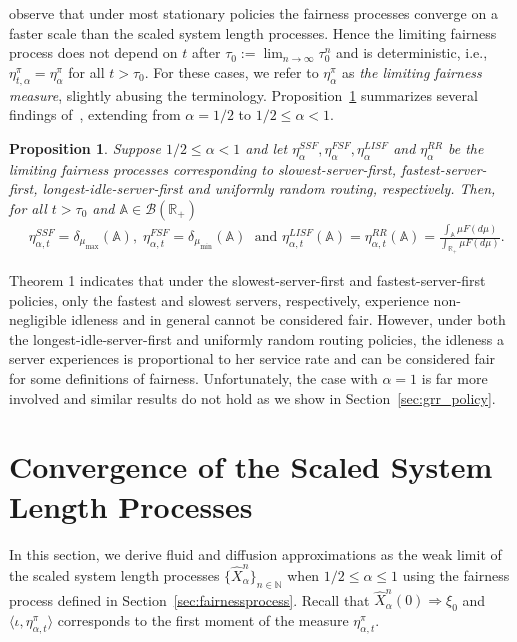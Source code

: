\documentclass[a4paper,11pt,twoside]{article}
\numberwithin{equation}{section}
\numberwithin{figure}{section}
\theoremstyle{plain}
\newtheorem{proposition}[theorem]{Proposition}
\newcommand{\cB}{\mathcal{B}}
\newcommand{\AAA}{\mathbb{A}}
\newcommand{\NN}{\mathbb{N}}
\newcommand{\RR}{\mathbb{R}}
\newcommand{\1}{\mathbbm{1}}
\begin{document}
\cite{bukeqin2019} observe that under most stationary policies the fairness processes converge on a faster scale than the scaled system length processes. Hence the limiting fairness process does not depend on $t$ after $\tau_0:=\lim_{n\to\infty}\tau_0^n$ and is deterministic, i.e., $\eta_{t,\alpha}^\pi=\eta_\alpha^\pi$ for all $t>\tau_0$. For these cases, we refer to $\eta_\alpha^\pi$ as \textit{the limiting fairness measure}, slightly abusing the terminology. Proposition~\ref{thm:specialpolicies} summarizes several findings of~\cite{bukeqin2019}, extending from $\alpha=1/2$ to $1/2\leq \alpha <1$. 
\begin{proposition}\label{thm:specialpolicies}
Suppose $1/2\leq \alpha <1$ and let   $\eta_\alpha^{SSF}, \eta_\alpha^{FSF}, \eta_\alpha^{LISF}$ and $\eta_\alpha^{RR}$ be the limiting fairness processes corresponding to slowest-server-first, fastest-server-first, longest-idle-server-first and uniformly random routing, respectively. Then, for all $t>\tau_0$ and $\AAA\in \cB(\RR_+)$
\begin{align*}
     &\eta_{\alpha,t}^{SSF} = \delta_{\mu_{\max}}(\AAA), \;
     \eta_{\alpha,t}^{FSF}= \delta_{\mu_{\min}}(\AAA) \; \textrm{ and }\eta_{\alpha,t}^{LISF}( \AAA)=\eta_{\alpha,t}^{RR}( \AAA)=
     \frac{\int_\AAA\mu F(d\mu)}{\int_{\RR_+}\mu F(d\mu)}
     .
\end{align*}
\end{proposition}

Theorem 1 indicates that under the slowest-server-first and fastest-server-first policies, only the fastest and slowest servers, respectively, experience non-negligible idleness and in general cannot be considered fair. However, under both the longest-idle-server-first and uniformly random routing policies, the idleness a server experiences is proportional to her service rate and can be considered fair for some definitions of fairness. Unfortunately, the case with $\alpha=1$ is far more involved and similar results do not hold as we show in Section~\ref{sec:grr_policy}.

\section{Convergence of the Scaled System Length Processes}\label{sec:convergence_system}

In this section, we derive fluid and diffusion approximations as the weak limit of the scaled system length processes $\{\hat{X}_\alpha^n\}_{n\in\NN}$ when $1/2\leq \alpha\leq 1$ using the fairness process defined in Section~\ref{sec:fairnessprocess}. Recall that  $\hat{X}_\alpha^n(0)\Rightarrow \xi_0$ and $\langle \iota, \eta_{\alpha,t}^\pi\rangle$ corresponds to the first moment of the measure $\eta_{\alpha,t}^\pi$. 
\end{document}

